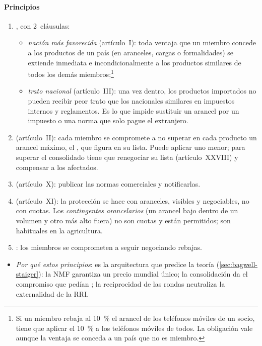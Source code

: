 \documentclass[11pt]{article}
\begin{document}
\paragraph{Principios}

\begin{enumerate}
\item {}, con 2~cláusulas:
  \begin{itemize}
  \item \emph{nación más favorecida} (artículo~I): toda ventaja que un miembro concede a los productos de un país (en aranceles, cargas o formalidades) se extiende inmediata e incondicionalmente a los productos similares de todos los demás miembros;\footnote{Si un miembro rebaja al 10~\% el arancel de los teléfonos móviles de un socio, tiene que aplicar el 10~\% a los teléfonos móviles de todos. La obligación vale aunque la ventaja se conceda a un país que no es miembro.}
  \item \emph{trato nacional} (artículo~III): una vez dentro, los productos importados no pueden recibir peor trato que los nacionales similares en impuestos internos y reglamentos. Es lo que impide sustituir un arancel por un impuesto o una norma que solo pague el extranjero.
  \end{itemize}
\item {} (artículo~II): cada miembro se compromete a no superar en cada producto un arancel máximo, el , que figura en su lista. Puede aplicar uno menor; para superar el consolidado tiene que renegociar su lista (artículo~XXVIII) y compensar a los afectados.
\item {} (artículo~X): publicar las normas comerciales y notificarlas.
\item {} (artículo~XI): la protección se hace con aranceles, visibles y negociables, no con cuotas. Los \emph{contingentes arancelarios} (un arancel bajo dentro de un volumen y otro más alto fuera) no son cuotas y están permitidos; son habituales en la agricultura.
\item {}: los miembros se comprometen a seguir negociando rebajas.
\end{enumerate}

\begin{itemize}
\item \emph{Por qué estos principios}: es la arquitectura que predice la teoría (\ref{sec:bagwell-staiger}): la NMF garantiza un precio mundial único; la consolidación da el compromiso que pedían \textcite{MaggiRodriguezClare1998Value}; la reciprocidad de las rondas neutraliza la externalidad de la RRI.
\end{itemize}
\end{document}
